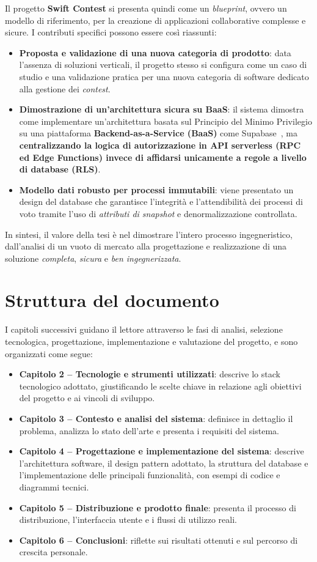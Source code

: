 Il progetto \textbf{Swift Contest} si presenta quindi come un \emph{blueprint}, ovvero un modello di riferimento, per la creazione di applicazioni collaborative complesse e sicure.
I contributi specifici possono essere così riassunti:
\begin{itemize}
    \item \textbf{Proposta e validazione di una nuova categoria di prodotto}: data l'assenza di soluzioni verticali, il progetto stesso si configura come un caso di studio e una validazione pratica per una nuova categoria di software dedicato alla gestione dei \emph{contest}.
    \item \textbf{Dimostrazione di un'architettura sicura su BaaS}: il sistema dimostra come implementare un'architettura basata sul Principio del Minimo Privilegio su una piattaforma \textbf{Backend-as-a-Service (BaaS)} come Supabase~\cite{supabase_docs}, ma \textbf{centralizzando la logica di autorizzazione in API serverless (RPC ed Edge Functions) invece di affidarsi unicamente a regole a livello di database (RLS)}.
    \item \textbf{Modello dati robusto per processi immutabili}: viene presentato un design del database che garantisce l'integrità e l'attendibilità dei processi di voto tramite l'uso di \emph{attributi di snapshot} e denormalizzazione controllata.
\end{itemize}
In sintesi, il valore della tesi è nel dimostrare l'intero processo ingegneristico, dall'analisi di un vuoto di mercato alla progettazione e realizzazione di una soluzione \emph{completa}, \emph{sicura} e \emph{ben ingegnerizzata}.

\section{Struttura del documento}\label{sec:struttura-del-documento}
I capitoli successivi guidano il lettore attraverso le fasi di analisi, selezione tecnologica, progettazione, implementazione e valutazione del progetto, e sono organizzati come segue:
\begin{itemize}
    \item \textbf{Capitolo 2 – Tecnologie e strumenti utilizzati}: descrive lo stack tecnologico adottato, giustificando le scelte chiave in relazione agli obiettivi del progetto e ai vincoli di sviluppo.
    \item \textbf{Capitolo 3 – Contesto e analisi del sistema}: definisce in dettaglio il problema, analizza lo stato dell’arte e presenta i requisiti del sistema.
    \item \textbf{Capitolo 4 – Progettazione e implementazione del sistema}: descrive l’architettura software, il design pattern adottato, la struttura del database e l’implementazione delle principali funzionalità, con esempi di codice e diagrammi tecnici.
    \item \textbf{Capitolo 5 – Distribuzione e prodotto finale}: presenta il processo di distribuzione, l’interfaccia utente e i flussi di utilizzo reali.
    \item \textbf{Capitolo 6 – Conclusioni}: riflette sui risultati ottenuti e sul percorso di crescita personale.
\end{itemize}